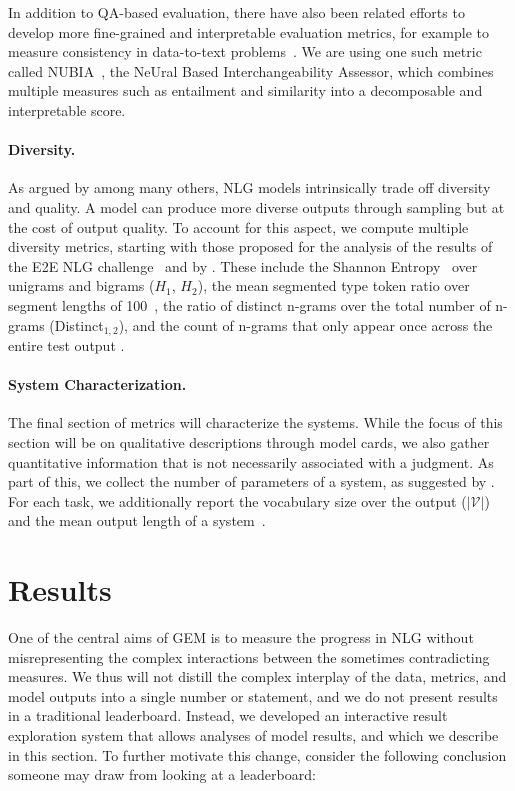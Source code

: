 \documentclass[11pt,a4paper]{article}
\newcommand{\GEM}{\textsc{GEM}}
\begin{document}
In addition to QA-based evaluation, there have also been related efforts to develop more fine-grained and interpretable evaluation metrics, for example to measure consistency in data-to-text problems~\citep{opitz2020towards,dhingra2019handling}. We are using one such metric called NUBIA~\citep{kane-etal-2020-nubia}, the NeUral Based Interchangeability Assessor, which combines multiple measures such as entailment and similarity into a decomposable and interpretable score. 


\paragraph{Diversity.} As argued by \citet{hashimoto2019unifying} among many others, NLG models intrinsically trade off diversity and quality. A model can produce more diverse outputs through sampling but at the cost of output quality. To account for this aspect, we compute multiple diversity metrics, starting with those proposed for the analysis of the results of the E2E NLG challenge~\citep{duvsek2020evaluating} and by \citet{vanmiltenburg2018measuring}. These include the Shannon Entropy~\citep{shannon2001mathematical} over unigrams and bigrams ($H_1$, $H_2$), the mean segmented type token ratio over segment lengths of 100~\citep[MSTTR,][]{johnson1944studies}, the ratio of distinct n-grams over the total number of n-grams (Distinct$_{1,2}$), and the count of n-grams that only appear once across the entire test output \citep[Unique$_{1,2}$,][]{li2016diversity}. 

\paragraph{System Characterization.} The final section of metrics will characterize the systems. While the focus of this section will be on qualitative descriptions through model cards, we also gather quantitative information that is not necessarily associated with a judgment. As part of this, we collect the number of parameters of a system, as suggested by \citet{ethayarajh2020utility}. For each task, we additionally report the vocabulary size over the output ($|\mathcal{V}|$) and the mean output length of a system~\citep{sun2019compare}.

\section{Results}

One of the central aims of \GEM{} is to measure the progress in NLG without misrepresenting the complex interactions between the sometimes contradicting measures. We thus will not distill the complex interplay of the data, metrics, and model outputs into a single number or statement, and we do not present results in a traditional leaderboard. Instead, we developed an interactive result exploration system that allows analyses of model results, and which we describe in this section. To further motivate this change, consider the following conclusion someone may draw from looking at a leaderboard:
\end{document}
